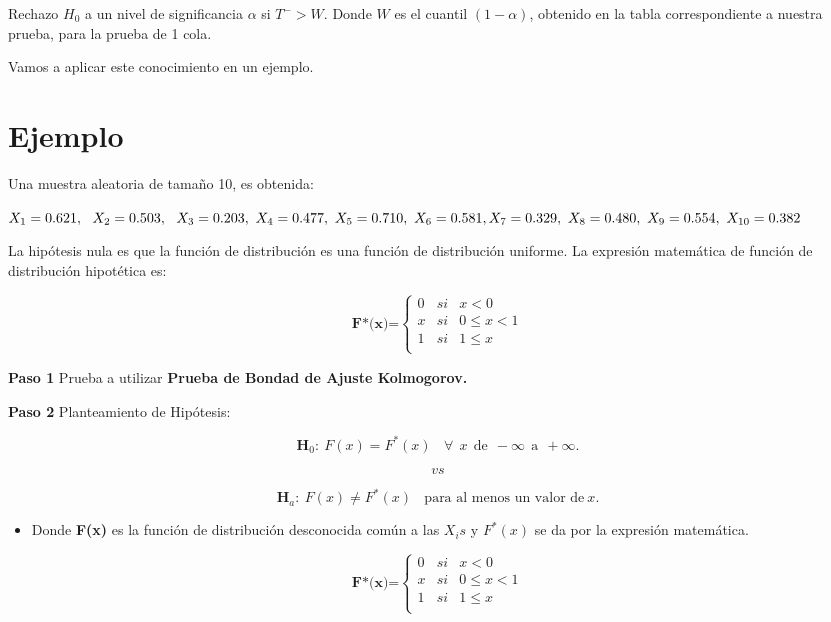 \documentclass[
  a4paper,
  oneside,
  openany]{book}
\providecommand{\tightlist}{%
  \setlength{\itemsep}{0pt}\setlength{\parskip}{0pt}}
\begin{document}
Rechazo \(H_0\) a un nivel de significancia \(\alpha\) si \(T^->W\). Donde \(W\) es el cuantil \((1-\alpha)\), obtenido en la tabla correspondiente a nuestra prueba, para la prueba de 1 cola.

Vamos a aplicar este conocimiento en un ejemplo.

\hypertarget{ejemplo-12}{%
\section{Ejemplo}\label{ejemplo-12}}

Una muestra aleatoria de tamaño 10, es obtenida:

\(X_{1}=0.621,\ \ X_{2}=0.503, \ \ X_{3}=0.203, \ X_{4}=0.477, \ X_{5}=0.710, \ X_{6}=0.581, \\ X_{7}=0.329, \ X_{8}=0.480, \  X_{9}=0.554, \ X_{10}=0.382\)

La hipótesis nula es que la función de distribución es una función de distribución uniforme.
La expresión matemática de función de distribución hipotética es:

\[
\textbf{F*(x)=} \left\{
\begin{array}{lcc}
0 & si & x < 0 \\
x & si & 0 \leq x < 1 \\
1 & si & 1 \leq x \\
\end{array}
\right.
\]

\textbf{Paso 1} Prueba a utilizar \textbf{Prueba de Bondad de Ajuste Kolmogorov.}

\textbf{Paso 2} Planteamiento de Hipótesis:

\[\textbf{H}_0: \ F(x)=F^*(x) \ \ \ \ \forall \ \ x \ \ \mbox{de} \ \ -\infty \ \  \mbox{a} \ \  +\infty.\]

\[vs\]

\[\textbf{H}_a: \ F(x) \neq F^*(x) \ \ \ \ \mbox{para al menos un  valor de} \  x.\]

\begin{itemize}
\tightlist
\item
  Donde \textbf{F(x)} es la función de distribución desconocida común a las \(X_{i}s\) y \(F^*(x)\) se da por la expresión matemática.
\end{itemize}

\[
\textbf{F*(x)=} \left\{
\begin{array}{lcc}
0 & si & x < 0 \\
x & si & 0 \leq x < 1 \\
1 & si & 1 \leq x \\
\end{array}
\right.
\]
\end{document}

